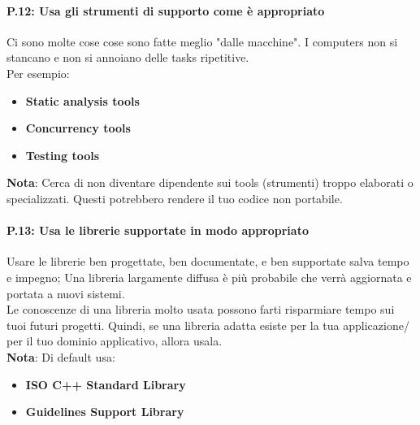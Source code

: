 \paragraph{P.12: Usa gli strumenti di supporto come è appropriato}

\textsf{\small Ci sono molte cose cose sono fatte meglio "dalle macchine". I computers non si stancano e non si annoiano delle tasks ripetitive.} \\

\textsf{\small Per esempio: } \\

\begin{itemize}
	\item \textsf{\small \textbf{Static analysis tools}} %
	\item \textsf{\small \textbf{Concurrency tools}} %
	\item \textsf{\small \textbf{Testing tools}} %
\end{itemize}

\textsf{\small \textbf{Nota}: Cerca di non diventare dipendente sui tools (strumenti) troppo elaborati o specializzati. Questi potrebbero rendere il tuo codice non portabile.} \\

\paragraph{P.13: Usa le librerie supportate in modo appropriato}

\textsf{\small Usare le librerie ben progettate, ben documentate, e ben supportate salva tempo e impegno; Una libreria largamente diffusa è più probabile che verrà aggiornata e portata a nuovi sistemi.} \\

\textsf{\small Le conoscenze di una libreria molto usata possono farti risparmiare tempo sui tuoi futuri progetti. Quindi, se una libreria adatta esiste per la tua applicazione/ per il tuo dominio applicativo, allora usala.} \\

\textsf{\small \textbf{Nota}: Di default usa: }

\begin{itemize}
	\item \textsf{\small \textbf{ISO C++ Standard Library}} %
	\item \textsf{\small \textbf{Guidelines Support Library}} %
\end{itemize}

